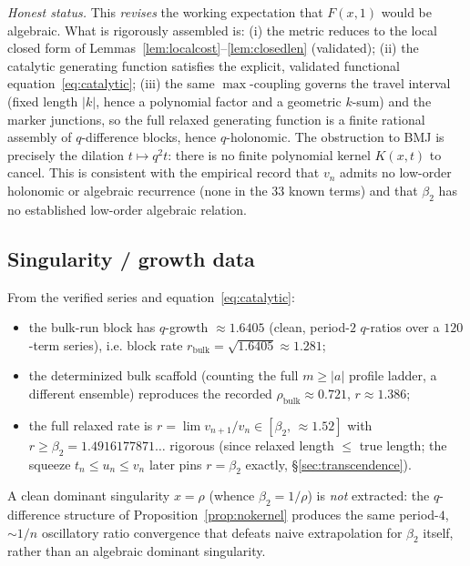 \noindent\emph{Honest status.} This \emph{revises} the working expectation that
$F(x,1)$ would be algebraic. What is rigorously assembled is:
(i) the metric reduces to the local closed form of
Lemmas~\ref{lem:localcost}--\ref{lem:closedlen} (validated);
(ii) the catalytic generating function satisfies the explicit, validated
functional equation~\eqref{eq:catalytic};
(iii) the same $\max$-coupling governs the travel interval (fixed length $|k|$,
hence a polynomial factor and a geometric $k$-sum) and the marker junctions, so
the full relaxed generating function is a finite rational assembly of
$q$-difference blocks, hence $q$-holonomic.
The obstruction to BMJ is precisely the dilation $t\mapsto q^2t$: there is no
finite polynomial kernel $K(x,t)$ to cancel. This is consistent with the
empirical record that $v_n$ admits no low-order holonomic or algebraic recurrence
(none in the $33$ known terms) and that $\beta_2$ has no established low-order
algebraic relation.

\subsection{Singularity / growth data}

From the verified series and equation~\eqref{eq:catalytic}:
\begin{itemize}
\item the bulk-run block has $q$-growth $\approx1.6405$ (clean, period-$2$
      $q$-ratios over a $120$-term series), i.e. block rate
      $r_{\mathrm{bulk}}=\sqrt{1.6405}\approx1.281$;
\item the determinized bulk scaffold (counting the full $m\ge|a|$ profile ladder,
      a different ensemble) reproduces the recorded $\rho_{\mathrm{bulk}}\approx
      0.721$, $r\approx1.386$;
\item the full relaxed rate is $r=\lim v_{n+1}/v_n\in[\beta_2,\,{\approx}1.52]$
      with $r\ge\beta_2=1.4916177871\ldots$ rigorous (since relaxed length $\le$ true length;
      the squeeze $t_n\le u_n\le v_n$ later pins $r=\beta_2$ exactly, \S\ref{sec:transcendence}).
\end{itemize}
A clean dominant singularity $x=\rho$ (whence $\beta_2=1/\rho$) is \emph{not}
extracted: the $q$-difference structure of Proposition~\ref{prop:nokernel}
produces the same period-$4$, $\sim1/n$ oscillatory ratio convergence that
defeats naive extrapolation for $\beta_2$ itself, rather than an algebraic
dominant singularity.
